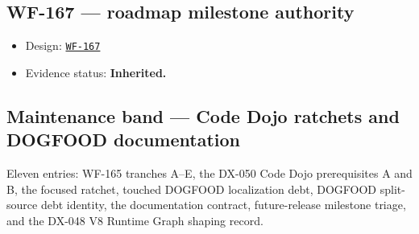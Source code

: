 \subsection{WF-167 --- roadmap milestone authority}\label{record-262-wf-167-roadmap-milestone-authority}

\begin{itemize}
\tightlist
\item
  Design: \href{https://github.com/flyingrobots/bijou/blob/cbd70612140e7a450d764b3c7be1c6af878b99bc/docs/design/WF-167-roadmap-milestone-authority.md}{\texttt{W\allowbreak{}F\allowbreak{}-\allowbreak{}1\allowbreak{}6\allowbreak{}7}}
\item
  Evidence status: \textbf{Inherited.}
\end{itemize}

\subsection{Maintenance band --- Code Dojo ratchets and DOGFOOD documentation}\label{record-262-maintenance-band-code-dojo-ratchets-and-dogfood-documentation}

Eleven entries: WF-165 tranches A--E, the DX-050 Code Dojo prerequisites A and B, the focused ratchet, touched DOGFOOD localization debt, DOGFOOD split-source debt identity, the documentation contract, future-release milestone triage, and the DX-048 V8 Runtime Graph shaping record.

